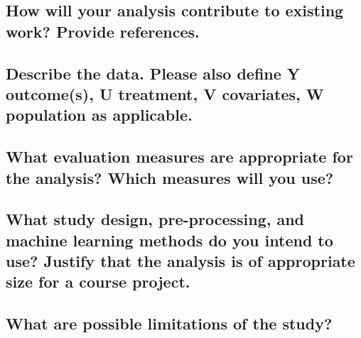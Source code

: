 \documentclass[twoside,11pt]{article}
\begin{document}
\subsection{How will your analysis contribute to existing work? Provide references.}


\subsection{Describe the data. Please also define Y outcome(s), U treatment, V covariates, W population as applicable.}


\subsection{What evaluation measures are appropriate for the analysis? Which measures will you use?}


\subsection{What study design, pre-processing, and machine learning methods do you intend to use? Justify that the analysis is of appropriate size for a course project.}


\subsection{What are possible limitations of the study?}



\end{document}

